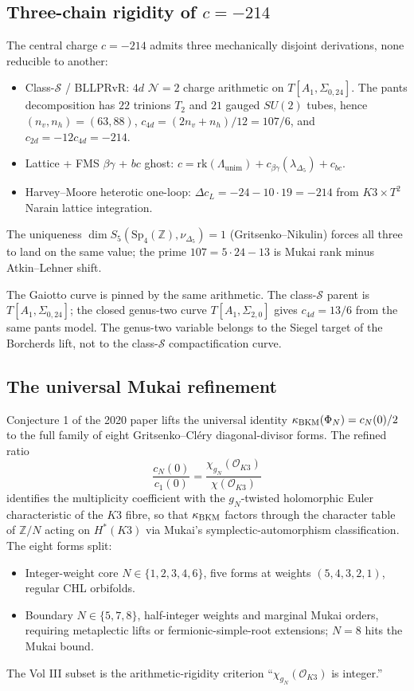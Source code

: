 \subsection{Three-chain rigidity of $c = -214$}

The central charge $c = -214$ admits three mechanically disjoint derivations,
none reducible to another:
\begin{itemize}
\item[$\mathbf{S_1}$] Class-$\mathcal{S}$ / BLLPRvR: $4d$ $\mathcal{N}=2$ charge arithmetic on $T[A_1,\Sigma_{0,24}]$.  The pants decomposition has $22$ trinions $T_2$ and $21$ gauged $SU(2)$ tubes, hence $(n_v,n_h)=(63,88)$, $c_{4d}=(2n_v+n_h)/12=107/6$, and $c_{2d}=-12c_{4d}=-214$.
\item[$\mathbf{S_2}$] Lattice + FMS $\beta\gamma$ + $bc$ ghost: $c = \mathrm{rk}(\Lambda_{\mathrm{unim}}) + c_{\beta\gamma}(\lambda_{\Delta_5}) + c_{bc}$.
\item[$\mathbf{S_3}$] Harvey--Moore heterotic one-loop: $\Delta c_L = -24 - 10 \cdot 19 = -214$ from $K3 \times T^2$ Narain lattice integration.
\end{itemize}
The uniqueness $\dim S_5(\mathrm{Sp}_4(\mathbb{Z}), \nu_{\Delta_5}) = 1$
(Gritsenko--Nikulin) forces all three to land on the same value; the prime
$107 = 5 \cdot 24 - 13$ is Mukai rank minus Atkin--Lehner shift.

The Gaiotto curve is pinned by the same arithmetic.  The class-$\mathcal S$
parent is $T[A_1,\Sigma_{0,24}]$; the closed genus-two curve
$T[A_1,\Sigma_{2,0}]$ gives $c_{4d}=13/6$ from the same pants model.
The genus-two variable belongs to the Siegel target of the Borcherds lift,
not to the class-$\mathcal S$ compactification curve.

\subsection{The universal Mukai refinement}

Conjecture 1 of the 2020 paper lifts the universal identity
$\kappa_{\mathrm{BKM}}(\Phi_N) = c_N(0)/2$ to the full family of eight Gritsenko--Cl\'ery
diagonal-divisor forms. The refined ratio
\[
\frac{c_N(0)}{c_1(0)} = \frac{\chi_{g_N}(\mathcal{O}_{K3})}{\chi(\mathcal{O}_{K3})}
\]
identifies the multiplicity coefficient with the $g_N$-twisted holomorphic
Euler characteristic of the $K3$ fibre, so that $\kappa_{\mathrm{BKM}}$ factors through
the character table of $\mathbb{Z}/N$ acting on $H^*(K3)$ via Mukai's
symplectic-automorphism classification. The eight forms split:
\begin{itemize}
\item Integer-weight core $N \in \{1, 2, 3, 4, 6\}$, five forms at weights $(5, 4, 3, 2, 1)$, regular CHL orbifolds.
\item Boundary $N \in \{5, 7, 8\}$, half-integer weights and marginal Mukai orders, requiring metaplectic lifts or fermionic-simple-root extensions; $N = 8$ hits the Mukai bound.
\end{itemize}
The Vol III subset is the arithmetic-rigidity criterion
``$\chi_{g_N}(\mathcal{O}_{K3})$ is integer.''

